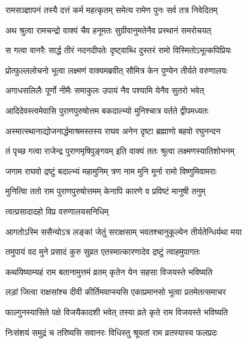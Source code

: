 \twolineshloka
{रामसञ्ज्ञापनं तस्यै दत्तं कर्म महत्कृतम्}
{समेत्य रामेण पुनः सर्व तत्र निवेदितम्} %

\twolineshloka
{अथ श्रुत्वा रामचन्द्रो वाक्यं चैव हनूमतः}
{सुग्रीवानुमतेनैव प्रस्थानं समरोचयत्} %

\twolineshloka
{स गत्वा वानरैः सार्द्ध तीरं नदनदीपतेः}
{दृष्ट्वाब्धि दुस्तरं रामो विस्मितोऽभूत्कपिप्रियः} %

\twolineshloka
{प्रोत्फुल्ललोचनो भूत्वा लक्ष्मणं वाक्यमब्रवीत्}
{सौमित्र केन पुण्येन तीर्यते वरुणालयः} %

\twolineshloka
{अगाधसलिलैः पूर्णो नीमैः समाकुलः}
{उपायं नैव पश्यामि येनैव सुतरो भवेत्} %


\twolineshloka
{आदिदेवस्त्वमेवासि पुराणपुरुषोत्तम}
{बकदाल्भ्यो मुनिश्चात्र वर्तते द्वीपमध्यतः} %

\twolineshloka
{अस्मात्स्थानाद्योजनार्द्धमाश्रमस्तस्य राघव}
{अनेन दृष्टा ब्रह्माणो बहवो रघुनन्दन} %

\twolineshloka
{तं पृच्छ गत्वा राजेन्द्र पुराणमृषिपुङ्गवम्}
{इति वाक्यं ततः श्रुत्वा लक्ष्मणस्यातिशोभनम्} %

\twolineshloka
{जगाम राघवो द्रष्टुं बदाल्भ्यं महामुनिम्}
{त्रण नाम मुनि मूर्ना रामो विष्णुमिवामराः} %

\twolineshloka
{मुनित्विा ततो राम पुराणपुरुषोत्तमम्}
{केनापि कारणे व प्रविष्टं मानुषी तनुम्} %



\onelineshloka
{त्वत्प्रसादादहो विप्र वरुणालयसनिधिम्} %

\twolineshloka
{आगतोऽस्मि ससैन्योऽत्र लङ्कां जेतुं सराक्षसाम्}
{भवतश्चानुकूल्येन तीर्यतेन्धिर्यथा मया} %

\twolineshloka
{तमुपायं वद मुने प्रसादं कुरु सुव्रत}
{एतस्मात्कारणादेव द्रष्टुं त्वाहमुपागतः} %


\twolineshloka
{कथयिष्याम्यहं राम बतानामुत्तमं व्रतम्}
{कृतेन येन सहसा विजयस्ते भविष्यति} %

\twolineshloka
{लड़ां जित्वा राक्षसांश्च दीवी कीर्तिमवाप्स्यसि}
{एकाप्रमानसो भूत्वा प्रतमेतत्समाचर} %

\twolineshloka
{फाल्गुनस्यासिते पक्षे विजयैकादशी भवेत्}
{तस्या व्रते कृते राम विजयस्ते भविष्यति} %

\twolineshloka
{निःसंशयं समुद्रं च तरिष्यसि सवानरः}
{विधिस्तु श्रूयतां राम व्रतस्यास्य फलप्रदः} %

